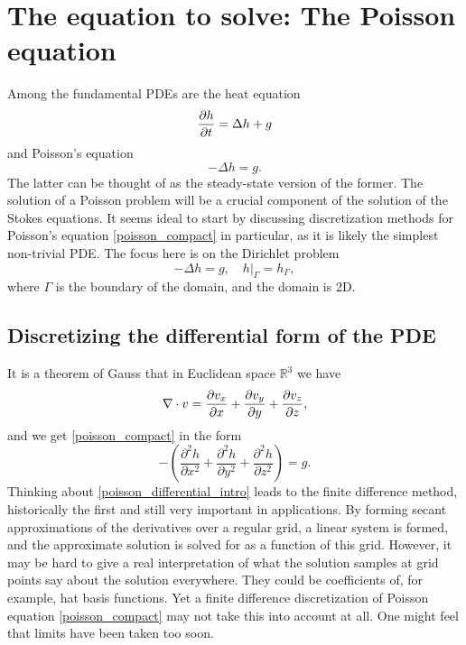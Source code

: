 \section{The equation to solve: The Poisson equation}

Among the fundamental PDEs
are the heat equation
    $$\frac{\partial h}{\partial t} = \Delta h + g$$
and Poisson's equation
\begin{equation}\label{poisson_compact}
    -\Delta h = g.
\end{equation}
The latter can be thought of as the steady-state version of the former. The solution of a Poisson problem will be a crucial component
of the solution of the Stokes equations. It seems ideal to start by discussing
discretization methods for Poisson's equation \eqref{poisson_compact} in particular,
as it is likely the simplest non-trivial PDE.
The focus here is on the Dirichlet problem
\begin{equation}\label{poisson_dirichlet_problem}
    -\Delta h = g, \quad \left.h\right|_{\Gamma} = h_\Gamma,
\end{equation}
where $\Gamma$ is the boundary of the domain, and the domain is 2D.

\subsection{Discretizing the differential form of the PDE}
It is a theorem of Gauss that in Euclidean space $\mathbb{R}^3$ we have
\begin{equation}\label{gauss_euclidean_divergence}
    \nabla \cdot v = \frac{\partial v_x}{\partial x} + \frac{\partial v_y}{\partial y} + \frac{\partial v_z}{\partial z},
\end{equation}
and we get \eqref{poisson_compact} in the form
\begin{equation}\label{poisson_differential_intro}
    -\left(\frac{\partial^2 h}{\partial x^2}
           +\frac{\partial^2 h}{\partial y^2}
           +\frac{\partial^2 h}{\partial z^2}\right) = g.
\end{equation}
Thinking about \eqref{poisson_differential_intro} leads to the finite difference method, historically the first and
still very important in applications.
By forming secant approximations of the derivatives over a regular grid, a linear system is formed, and the approximate solution is solved
for as a function of this grid.
However, it may be hard to give a real interpretation of what the solution samples at grid points say about the solution everywhere.
They could be coefficients of, for example, hat basis functions.
Yet a finite difference discretization of Poisson equation \eqref{poisson_compact} may not take this into account at all. One might feel that
limits have been taken too soon.

